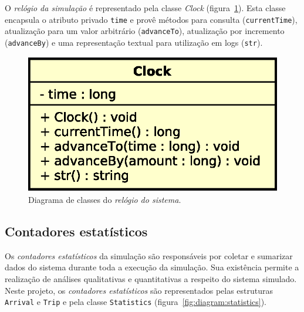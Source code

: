 O \textit{relógio da simulação} é representado pela classe \textit{Clock}
(figura~\ref{fig:diagram:clock}). Esta classe encapsula o atributo privado
\texttt{time} e provê métodos para consulta (\texttt{currentTime}), atualização
para um valor arbitrário (\texttt{advanceTo}), atualização por incremento
(\texttt{advanceBy}) e uma representação textual para utilização em logs
(\texttt{str}).

\begin{figure}[htb!]
  \centering
  \includegraphics[scale=0.6]{img/Clock}
  \caption{Diagrama de classes do \textit{relógio do sistema}.}
\label{fig:diagram:clock}
\end{figure}

\subsection{Contadores estatísticos}

Os \textit{contadores estatísticos} da simulação são responsáveis por coletar e
sumarizar dados do sistema durante toda a execução da simulação. Sua existência
permite a realização de análises qualitativas e quantitativas a respeito do
sistema simulado. Neste projeto, os \textit{contadores estatísticos} são
representados pelas estruturas \texttt{Arrival} e \texttt{Trip} e pela classe
\texttt{Statistics} (figura~\ref{fig:diagram:statistics}).

